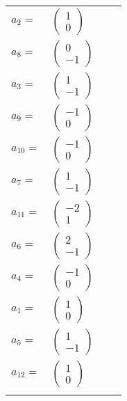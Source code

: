 \documentclass[1p]{elsarticle_modified}
\theoremstyle{definition}
\begin{document}
\begin{tabular}{m{7pt} m{180pt} m{7pt} m{180pt} }
\flushright $a_{2}=$&$\begin{pmatrix}1\\0\end{pmatrix}$ \\
\flushright $a_{8}=$&$\begin{pmatrix}0\\-1\end{pmatrix}$ \\
\flushright $a_{3}=$&$\begin{pmatrix}1\\-1\end{pmatrix}$ \\
\flushright $a_{9}=$&$\begin{pmatrix}-1\\0\end{pmatrix}$ \\
\flushright $a_{10}=$&$\begin{pmatrix}-1\\0\end{pmatrix}$ \\
\flushright $a_{7}=$&$\begin{pmatrix}1\\-1\end{pmatrix}$ \\
\flushright $a_{11}=$&$\begin{pmatrix}-2\\1\end{pmatrix}$ \\
\flushright $a_{6}=$&$\begin{pmatrix}2\\-1\end{pmatrix}$ \\
\flushright $a_{4}=$&$\begin{pmatrix}-1\\0\end{pmatrix}$ \\
\flushright $a_{1}=$&$\begin{pmatrix}1\\0\end{pmatrix}$ \\
\flushright $a_{5}=$&$\begin{pmatrix}1\\-1\end{pmatrix}$ \\
\flushright $a_{12}=$&$\begin{pmatrix}1\\0\end{pmatrix}$\\&\end{tabular}
\end{document}

